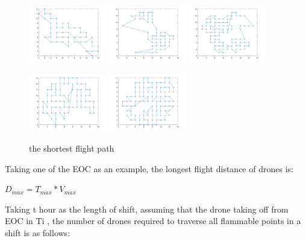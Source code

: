 \documentclass{mcmthesis}
\begin{document}
\begin{figure}[H]
  \centering
  {
  \includegraphics[width=0.3\textwidth]{image/A.png} 
  }
  {
  \includegraphics[width=0.3\textwidth]{image/B.png} 
  }
  {
  \includegraphics[width=0.3\textwidth]{image/C.png}
  }
\end{figure}

\begin{figure}[H]
  \centering
  \includegraphics[width=0.3\textwidth]{image/D.png} 
  \includegraphics[width=0.3\textwidth]{image/E.png} 
  \caption{the shortest flight path}
\end{figure}

Taking one of the EOC as an example, the longest flight distance of drones is:

$D_{max}=T_{max}*V_{max}$

Taking t hour as the length of shift, assuming that the drone taking off from EOC in Ti , the number of drones required to traverse all flammable points in a shift is as follows:
\end{document}
